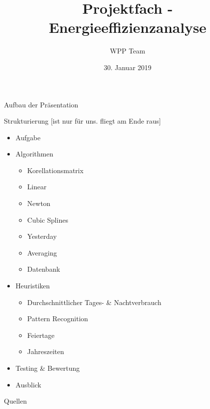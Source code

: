 \documentclass{beamer}           %
\title[WPP]{Projektfach - Energieeffizienzanalyse}
\author[Team]{WPP Team}
\institute{Hochschule Niederrhein - Fachbereich Elektrotechnik \& Informatik}
\date{30. Januar 2019}
\begin{document}
\frame[plain]{\titlepage}

\begin{frame}{Aufbau der Präsentation}
\tableofcontents  
\end{frame}

\begin{frame}{Strukturierung [ist nur für uns. fliegt am Ende raus]}
	\begin{itemize}
		\item Aufgabe %
		\item Algorithmen %
		\begin{itemize}
			\item Korellationsmatrix %
			\item Linear %
			\item Newton %
			\item Cubic Splines %
			\item Yesterday %
			\item Averaging %
			\item Datenbank %
		\end{itemize}
		\item Heuristiken %
		\begin{itemize}
			\item Durchschnittlicher Tages- \& Nachtverbrauch %
			\item Pattern Recognition %
			\item Feiertage %
			\item Jahreszeiten %
		\end{itemize}
		\item Testing \& Bewertung %
		\item Ausblick %
	\end{itemize}
\end{frame}



\begin{frame}{Quellen}




\end{frame}

\begin{frame}{}
\fontsize{24pt}{12pt}\selectfont
{}
\end{frame}
\end{document}
